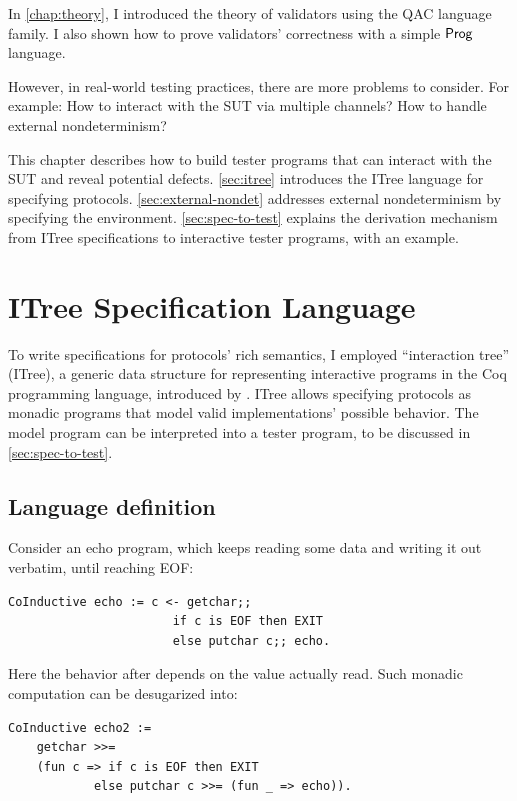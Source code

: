 In \autoref{chap:theory}, I introduced the theory of validators using the QAC
language family.  I also shown how to prove validators' correctness with a
simple $\mathsf{Prog}$ language.

However, in real-world testing practices, there are more problems to consider.
For example: How to interact with the SUT via multiple channels?  How to handle
external nondeterminism?

This chapter describes how to build tester programs that can interact with the
SUT and reveal potential defects.  \autoref{sec:itree} introduces the ITree
language for specifying protocols.  \autoref{sec:external-nondet} addresses
external nondeterminism by specifying the environment.
\autoref{sec:spec-to-test} explains the derivation mechanism from ITree
specifications to interactive tester programs, with an \http example.

\section{ITree Specification Language}
\label{sec:itree}
To write specifications for protocols' rich semantics, I employed ``interaction
tree'' (ITree), a generic data structure for representing interactive programs
in the Coq programming language, introduced by \textcite{itree}.  ITree allows
specifying protocols as monadic programs that model valid implementations'
possible behavior.  The model program can be interpreted into a tester program,
to be discussed in \autoref{sec:spec-to-test}.

\subsection{Language definition}
Consider an echo program, which keeps reading some data and writing it out
verbatim, until reaching EOF:
\begin{lstlisting}[style=customcoq]
  CoInductive echo := c <- getchar;;
                       if c is EOF then EXIT
                       else putchar c;; echo.
\end{lstlisting}

Here the behavior after  depends on the value actually read.  Such
monadic computation can be desugarized into:
\begin{lstlisting}[style=customcoq]
  CoInductive echo2 :=
    getchar >>=
    (fun c => if c is EOF then EXIT
            else putchar c >>= (fun _ => echo)).
\end{lstlisting}

